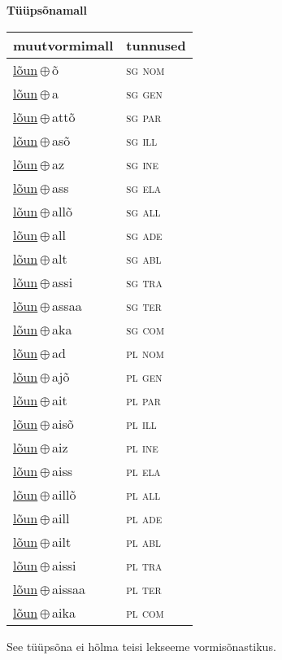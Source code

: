 

\vspace{3.5em}
\noindent \begin{minipage}{\textwidth}
\noindent \textbf{Tüüpsõnamall \,}\\

\begin{sideways}
\begin{tabular}{l l}
muutvormimall & tunnused \\
\hline
\underline{lõun}\,$\oplus$\,õ & \textsc{ sg nom } \\
\underline{lõun}\,$\oplus$\,a & \textsc{ sg gen } \\
\underline{lõun}\,$\oplus$\,attõ & \textsc{ sg par } \\
\underline{lõun}\,$\oplus$\,asõ & \textsc{ sg ill } \\
\underline{lõun}\,$\oplus$\,az & \textsc{ sg ine } \\
\underline{lõun}\,$\oplus$\,ass & \textsc{ sg ela } \\
\underline{lõun}\,$\oplus$\,allõ & \textsc{ sg all } \\
\underline{lõun}\,$\oplus$\,all & \textsc{ sg ade } \\
\underline{lõun}\,$\oplus$\,alt & \textsc{ sg abl } \\
\underline{lõun}\,$\oplus$\,assi & \textsc{ sg tra } \\
\underline{lõun}\,$\oplus$\,assaa & \textsc{ sg ter } \\
\underline{lõun}\,$\oplus$\,aka & \textsc{ sg com } \\
\underline{lõun}\,$\oplus$\,ad & \textsc{ pl nom } \\
\underline{lõun}\,$\oplus$\,ajõ & \textsc{ pl gen } \\
\underline{lõun}\,$\oplus$\,ait & \textsc{ pl par } \\
\underline{lõun}\,$\oplus$\,aisõ & \textsc{ pl ill } \\
\underline{lõun}\,$\oplus$\,aiz & \textsc{ pl ine } \\
\underline{lõun}\,$\oplus$\,aiss & \textsc{ pl ela } \\
\underline{lõun}\,$\oplus$\,aillõ & \textsc{ pl all } \\
\underline{lõun}\,$\oplus$\,aill & \textsc{ pl ade } \\
\underline{lõun}\,$\oplus$\,ailt & \textsc{ pl abl } \\
\underline{lõun}\,$\oplus$\,aissi & \textsc{ pl tra } \\
\underline{lõun}\,$\oplus$\,aissaa & \textsc{ pl ter } \\
\underline{lõun}\,$\oplus$\,aika & \textsc{ pl com } \\
\end{tabular}
\end{sideways}
\label{tab:tüüpsõnamall-lõunõ}

\end{minipage}

 
\vspace{1em}
\noindent See tüüpsõna ei hõlma teisi lekseeme vormi\-sõnastikus.
